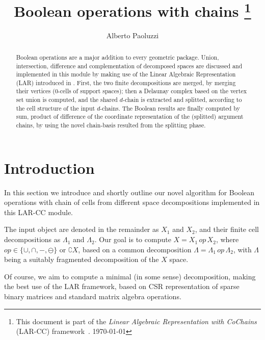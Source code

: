 \documentclass[11pt,oneside]{article}	%
\title{Boolean operations with chains
\footnote{This document is part of the \emph{Linear Algebraic Representation with CoChains} (LAR-CC) framework~\cite{cclar-proj:2013:00}. \today}
}
\author{Alberto Paoluzzi}
\begin{document}
\maketitle
\nonstopmode

\begin{abstract}
Boolean operations are a major addition to every geometric package. Union, intersection, difference and complementation of decomposed spaces are discussed and implemented in this module by making use of the Linear Algebraic Representation (LAR) introduced in \cite{Dicarlo:2014:TNL:2543138.2543294}. First, the two finite decompositions are merged, by merging their vertices (0-cells of support spaces); then a Delaunay complex based on the vertex set union is computed, and the shared $d$-chain is extracted and splitted, according to the cell structure of the input $d$-chains. The Boolean results are finally computed by sum, product of difference of the coordinate representation of the (splitted) argument chains, by using the novel chain-basis resulted from the splitting phase.
\end{abstract}
\tableofcontents
\section{Introduction}

In this section we introduce and shortly outline our novel algorithm for Boolean operations with chain of cells from different space decompositions implemented in this LAR-CC module.

The input object are denoted in the remainder as $X_1$ and $X_2$, and their finite cell decompositions as $\Lambda_1$ and $\Lambda_2$. Our goal is to compute $X = X_1\, op\, X_2$, where $op\in \{ \cup, \cap, -, \ominus \}$ or $\complement X$, based on a common decomposition $\Lambda = \Lambda_1\, op\, \Lambda_2$, with $\Lambda$ being a suitably fragmented decomposition of the $X$ space. 

Of course, we aim to compute a minimal (in some sense) decomposition, making the best use of the LAR framework, based on CSR representation of sparse binary matrices and standard matrix algebra operations.
\end{document}
